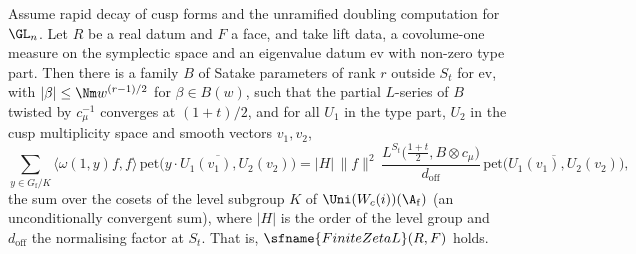 \begin{theorem}\label{pf:sh-theta:finzeta}
Assume rapid decay of cusp forms and the unramified doubling computation for $\GL_n$. Let $R$ be a real datum and $F$ a face, and
take lift data,
a covolume-one measure on the symplectic space and an eigenvalue datum $\mathrm{ev}$ with non-zero type part. Then there is a family
$B$ of Satake parameters of rank $r$ outside $S_t$ for $\mathrm{ev}$, with $|\beta|\le\Nm w^{(r-1)/2}$ for $\beta\in B(w)$, such that
the partial $L$-series of $B$ twisted by $c_\mu^{-1}$ converges at $(1+t)/2$, and for all $U_1$ in the type part, $U_2$ in the cusp
multiplicity space and smooth vectors $v_1,v_2$,
\[
\sum_{y\in G_{\mathrm f}/K}\langle\omega(1,y)f,f\rangle\,\overline{\mathrm{pet}\bigl(y\cdot U_1(v_1),U_2(v_2)\bigr)}
=|H|\,\|f\|^2\,\frac{L^{S_t}\bigl(\frac{1+t}2,B\otimes c_\mu\bigr)}{d_{\mathrm{off}}}\,\overline{\mathrm{pet}\bigl(U_1(v_1),U_2(v_2)\bigr)},
\]
the sum over the cosets of the level subgroup $K$ of $\Uni(W_c(i))(\A_{\mathrm f})$ (an unconditionally convergent sum), where $|H|$ is the order of
the level group and $d_{\mathrm{off}}$ the normalising factor at $S_t$. That is, $\sfname{FiniteZetaL}(R,F)$ holds.
\end{theorem}

